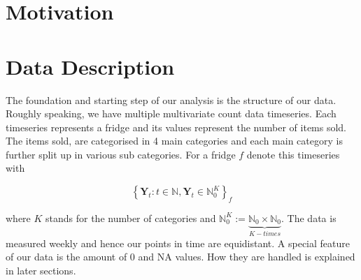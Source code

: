 \section{Motivation}
\label{sec:Motivation}

\section{Data Description}
\label{sec: Data Description}

The foundation and starting step of our analysis is the structure of our data. Roughly speaking, we have multiple multivariate count data timeseries. Each timeseries represents a fridge and its values represent the number of items sold. The items sold, are categorised in 4 main categories and each main category is further split up in various sub categories. For a fridge $f$ denote this timeseries with 

\begin{equation}
\left\{\bm{Y}_t:t\in \mathbb{N}, \bm{Y}_t \in \mathbb{N}_0^K \right\}_f
\label{eq:Timeseries definition}
\end{equation}

where $K$ stands for the number of categories and $\mathbb{N}_0^K := \underbrace{\mathbb{N}_0 \times \mathbb{N}_0}_{K-times}$. 
The data is measured weekly and hence our points in time are equidistant. A special feature of our data is the amount of 0 and NA values. How they are handled is explained in later sections. 